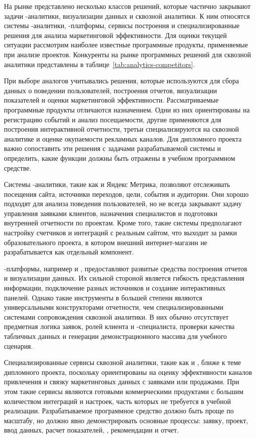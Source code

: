 На рынке представлено несколько классов решений, которые частично закрывают задачи -аналитики, визуализации данных и сквозной аналитики. К ним относятся системы -аналитики, -платформы, сервисы построения  и специализированные решения для анализа маркетинговой эффективности. Для оценки текущей ситуации рассмотрим наиболее известные программные продукты, применяемые при анализе  проектов. Конкуренты на рынке программных решений для сквозной аналитики  представлены в таблице~\ref{tab:analytics-competitors}.

При выборе аналогов учитывались решения, которые используются для сбора данных о поведении пользователей, построения отчетов, визуализации показателей и оценки маркетинговой эффективности. Рассматриваемые программные продукты отличаются назначением. Одни из них ориентированы на регистрацию событий и анализ посещаемости, другие применяются для построения интерактивной отчетности, третьи специализируются на сквозной аналитике и оценке окупаемости рекламных каналов. Для дипломного проекта важно сопоставить эти решения с задачами разрабатываемой системы и определить, какие функции должны быть отражены в учебном программном средстве.

Системы -аналитики, такие как  и Яндекс Метрика, позволяют отслеживать посещения сайта, источники переходов, цели, события и аудитории. Они хорошо подходят для анализа поведения пользователей, но не всегда закрывают задачу управления заявками клиентов, назначения специалистов и подготовки внутренней отчетности по проектам. Кроме того, такие системы предполагают настройку счетчиков и интеграций с реальным сайтом, что выходит за рамки образовательного проекта, в котором внешний интернет-магазин не разрабатывается как отдельный компонент.

-платформы, например  и , предоставляют развитые средства построения отчетов и визуализации данных. Их сильной стороной является гибкость представления информации, подключение разных источников и создание интерактивных панелей. Однако такие инструменты в большей степени являются универсальными конструкторами отчетности, чем специализированными системами сопровождения сквозной аналитики. В них обычно отсутствует предметная логика заявок, ролей клиента и -специалиста, проверки качества табличных данных и генерации демонстрационного массива для учебного сценария.

Специализированные сервисы сквозной аналитики, такие как  и , ближе к теме дипломного проекта, поскольку ориентированы на оценку эффективности каналов привлечения и связку маркетинговых данных с заявками или продажами. При этом такие сервисы являются готовыми коммерческими продуктами с большим количеством интеграций и настроек, часть которых не требуется в учебной реализации. Разрабатываемое программное средство должно быть проще по масштабу, но должно явно демонстрировать основные процессы: заявку, проект, ввод данных, расчет показателей, , рекомендации и отчет.

